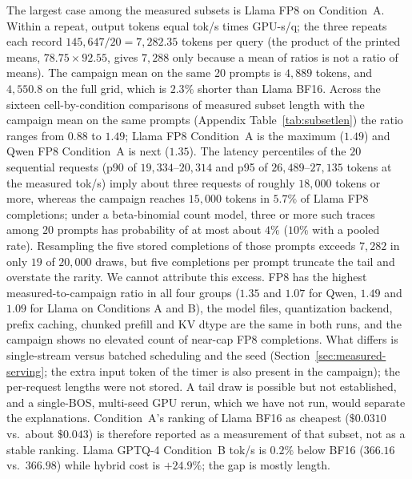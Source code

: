 \documentclass[11pt,a4paper]{article}
\begin{document}
The largest case among the measured subsets is Llama FP8 on Condition~A. Within a repeat, output tokens equal tok/s times GPU-s/q; the three repeats each record $145{,}647/20=7{,}282.35$ tokens per query (the product of the printed means, $78.75\times 92.55$, gives $7{,}288$ only because a mean of ratios is not a ratio of means). The campaign mean on the same 20 prompts is $4{,}889$ tokens, and $4{,}550.8$ on the full grid, which is $2.3\%$ shorter than Llama BF16. Across the sixteen cell-by-condition comparisons of measured subset length with the campaign mean on the same prompts (Appendix Table~\ref{tab:subsetlen}) the ratio ranges from $0.88$ to $1.49$; Llama FP8 Condition~A is the maximum ($1.49$) and Qwen FP8 Condition~A is next ($1.35$). The latency percentiles of the $20$ sequential requests (p90 of $19{,}334$--$20{,}314$ and p95 of $26{,}489$--$27{,}135$ tokens at the measured tok/s) imply about three requests of roughly $18{,}000$ tokens or more, whereas the campaign reaches $15{,}000$ tokens in $5.7\%$ of Llama FP8 completions; under a beta-binomial count model, three or more such traces among $20$ prompts has probability of at most about $4\%$ ($10\%$ with a pooled rate). Resampling the five stored completions of those prompts exceeds $7{,}282$ in only $19$ of $20{,}000$ draws, but five completions per prompt truncate the tail and overstate the rarity. We cannot attribute this excess. FP8 has the highest measured-to-campaign ratio in all four groups ($1.35$ and $1.07$ for Qwen, $1.49$ and $1.09$ for Llama on Conditions A and B), the model files, quantization backend, prefix caching, chunked prefill and KV dtype are the same in both runs, and the campaign shows no elevated count of near-cap FP8 completions. What differs is single-stream versus batched scheduling and the seed (Section~\ref{sec:measured-serving}; the extra input token of the timer is also present in the campaign); the per-request lengths were not stored. A tail draw is possible but not established, and a single-BOS, multi-seed GPU rerun, which we have not run, would separate the explanations. Condition~A's ranking of Llama BF16 as cheapest ($\$0.0310$ vs.\ about $\$0.043$) is therefore reported as a measurement of that subset, not as a stable ranking. Llama GPTQ-4 Condition~B tok/s is $0.2\%$ below BF16 ($366.16$ vs.\ $366.98$) while hybrid cost is $+24.9\%$; the gap is mostly length.
\end{document}
